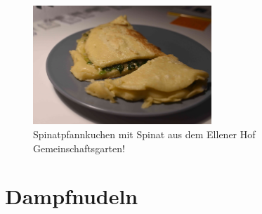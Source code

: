 \documentclass[a4paper, 12pt]{scrbook} 								%
\numberwithin{equation}{section} 									%
\begin{document}
		\begin{figure}[h]
			\centering
			\includegraphics[width = 0.6\textwidth]{media/spinat_pfannkuchen.JPG}
			\caption{Spinatpfannkuchen mit Spinat aus dem Ellener Hof Gemeinschaftsgarten!}
		\end{figure}

		\newpage


		\section{Dampfnudeln}	\label{dampfnudeln}
\end{document}
